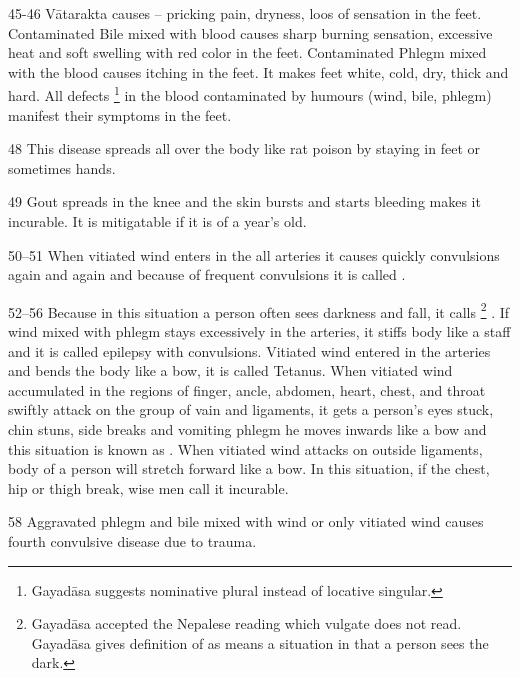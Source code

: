 \begin{translation}
\item[45-46] Vātarakta causes -- pricking pain, dryness, loos of sensation in the feet. Contaminated Bile mixed with blood causes sharp burning sensation, excessive heat and soft swelling with red color in the feet. Contaminated Phlegm mixed with the blood causes itching in the feet. It makes feet white, cold, dry, thick and hard. All defects \footnote{Gayadāsa suggests  nominative plural instead of locative singular.} in the blood contaminated by humours (wind, bile, phlegm) manifest their symptoms in the feet.

\item[48] This disease spreads all over the body like rat poison by staying in feet or sometimes hands.

\item[49] Gout spreads in the knee and the skin bursts and starts bleeding makes it incurable. It is mitigatable if it is of a year’s old.

\item[50--51] When vitiated wind enters in the all arteries it causes quickly 
convulsions again and again and because of frequent convulsions  it is 
called .

\item[52--56] Because in this situation a person often sees darkness and
fall, it calls  \footnote{Gayadāsa
    accepted the Nepalese reading  which vulgate does not read.
    Gayadāsa gives definition of  as  means a
    situation in that a person sees the dark.} . If wind mixed with phlegm
    stays excessively in the arteries, it stiffs body like a staff and it is
    called  epilepsy with convulsions. Vitiated wind entered
    in the arteries and bends the body like a bow, it is called
     Tetanus. When vitiated wind accumulated in the regions
    of finger, ancle, abdomen, heart, chest, and throat swiftly attack on the
    group of vain and ligaments, it gets a person’s eyes stuck, chin stuns,
    side breaks and vomiting phlegm he moves inwards like a bow and this
    situation is known as . When vitiated wind
    attacks on outside ligaments, body of a person will stretch forward like
    a bow. In this situation, if the chest, hip or thigh break, wise men call
    it incurable.

\item[58] Aggravated phlegm and bile mixed with wind or only vitiated wind causes fourth convulsive disease due to trauma.


\end{translation}
